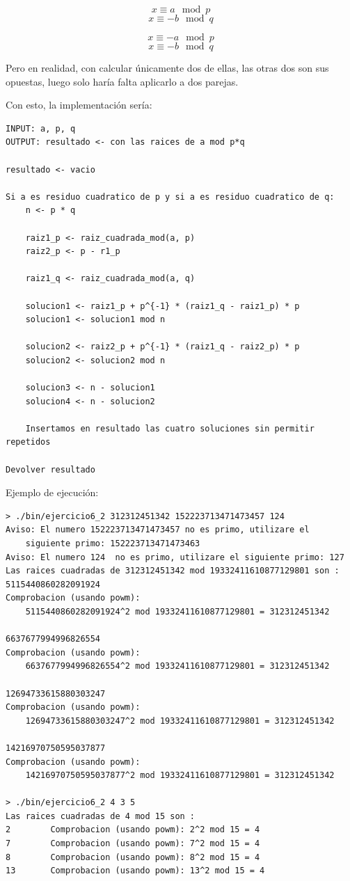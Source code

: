 \documentclass[12pt, spanish]{article}
\begin{document}
$$x \equiv a \mod p$$
$$x \equiv -b \mod q$$


$$x \equiv -a \mod p$$
$$x \equiv -b \mod q$$

Pero en realidad, con calcular únicamente dos de ellas, las otras dos son sus opuestas, luego solo haría falta aplicarlo a dos parejas.

Con esto, la implementación sería:


\begin{lstlisting}[caption={Algoritmo raices cuadradas mod p*q}]
INPUT: a, p, q
OUTPUT: resultado <- con las raices de a mod p*q

resultado <- vacio

Si a es residuo cuadratico de p y si a es residuo cuadratico de q:
	n <- p * q

	raiz1_p <- raiz_cuadrada_mod(a, p)
	raiz2_p <- p - r1_p

	raiz1_q <- raiz_cuadrada_mod(a, q)

	solucion1 <- raiz1_p + p^{-1} * (raiz1_q - raiz1_p) * p
	solucion1 <- solucion1 mod n

	solucion2 <- raiz2_p + p^{-1} * (raiz1_q - raiz2_p) * p
	solucion2 <- solucion2 mod n

	solucion3 <- n - solucion1
	solucion4 <- n - solucion2

	Insertamos en resultado las cuatro soluciones sin permitir repetidos

Devolver resultado
\end{lstlisting}

Ejemplo de ejecución:

\begin{lstlisting}
> ./bin/ejercicio6_2 312312451342 152223713471473457 124
Aviso: El numero 152223713471473457 no es primo, utilizare el
	siguiente primo: 152223713471473463
Aviso: El numero 124  no es primo, utilizare el siguiente primo: 127
Las raices cuadradas de 312312451342 mod 19332411610877129801 son :
5115440860282091924
Comprobacion (usando powm):
	5115440860282091924^2 mod 19332411610877129801 = 312312451342

6637677994996826554
Comprobacion (usando powm):
	6637677994996826554^2 mod 19332411610877129801 = 312312451342

12694733615880303247
Comprobacion (usando powm):
	12694733615880303247^2 mod 19332411610877129801 = 312312451342

14216970750595037877
Comprobacion (usando powm):
	14216970750595037877^2 mod 19332411610877129801 = 312312451342

> ./bin/ejercicio6_2 4 3 5
Las raices cuadradas de 4 mod 15 son :
2        Comprobacion (usando powm): 2^2 mod 15 = 4
7        Comprobacion (usando powm): 7^2 mod 15 = 4
8        Comprobacion (usando powm): 8^2 mod 15 = 4
13       Comprobacion (usando powm): 13^2 mod 15 = 4
\end{lstlisting}
\end{document}
